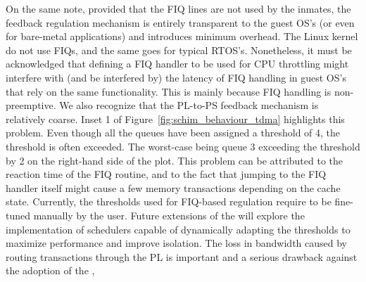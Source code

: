 {  On the same note, provided that the FIQ lines are not used by the
  inmates, the feedback regulation mechanism is entirely transparent
  to the guest OS's (or even for bare-metal applications) and
  introduces minimum overhead. The Linux kernel do not use FIQs, and
  the same goes for typical RTOS's. Nonetheless, it must be
  acknowledged that defining a FIQ handler to be used for CPU
  throttling might interfere with (and be interfered by) the latency
  of FIQ handling in guest OS's that rely on the same
  functionality. This is mainly because FIQ handling is
  non-preemptive. We also recognize that the PL-to-PS feedback
  mechanism is relatively coarse. Inset 1 of
  Figure~\ref{fig:schim_behaviour_tdma} highlights this problem. Even
  though all the queues have been assigned a threshold of 4, the
  threshold is often exceeded.  The worst-case being queue 3 exceeding
  the threshold by 2 on the right-hand side of the plot. This problem
  can be attributed to the reaction time of the FIQ routine, and to
  the fact that jumping to the FIQ handler itself might cause a few
  memory transactions depending on the cache state. Currently, the
  thresholds used for FIQ-based regulation require to be fine-tuned
  manually by the user. Future extensions of the \schim will explore
  the implementation of schedulers capable of dynamically adapting the
  thresholds to maximize performance and improve isolation. The loss in
  bandwidth caused by routing transactions through the PL
  is important and a serious drawback against the adoption of the
  \schim,}
